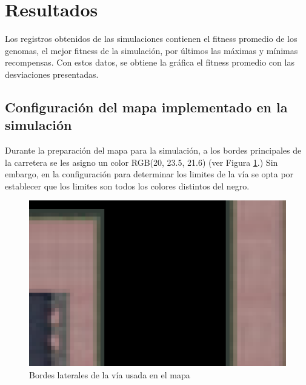 \documentclass[conference]{IEEEtran}
\begin{document}
\section{Resultados}
Los registros obtenidos de las simulaciones contienen el fitness promedio de los genomas, el mejor fitness de la simulación, por últimos las máximas y mínimas recompensas. Con estos datos, se obtiene la gráfica el fitness promedio con las desviaciones presentadas.

\subsection{Configuración del mapa implementado en la simulación}
Durante la preparación del mapa para la simulación, a los bordes principales de la carretera se les asigno un color RGB(20, 23.5, 21.6) (ver Figura \ref{fig:Bordes}.) Sin embargo, en la configuración para determinar los limites de la vía se opta por establecer que los limites son todos los colores distintos del negro.
\begin{figure}[ht]
    \centering    \includegraphics[width=0.4\linewidth]{Simulacion/Bordes.png}
    \caption{Bordes laterales de la vía usada en el mapa}
    \label{fig:Bordes}
\end{figure}
\end{document}
